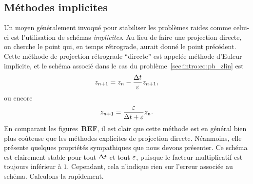 \subsection*{Méthodes implicites}

Un moyen généralement invoqué pour stabiliser les problèmes raides comme
celui-ci est l'utilisation de schémas \textit{implicites}. Au lieu de
faire une projection directe, on cherche le point qui, en temps
rétrograde, aurait donné le point précédent.
%
%
\noindent%
Cette méthode de projection rétrograde \enquote{directe} est appelée
méthode d'Euleur implicite, et le schéma associé dans le cas du
problème~\eqref{sec:intro:eq:pb_zlin} est 
\begin{equation*}
    z_{n+1} = z_n - \frac{\Delta t}{\varepsilon} z_{n+1} ,
\end{equation*}
ou encore 
\begin{equation*}
    z_{n+1} = \frac{\varepsilon}{\Delta t + \varepsilon} z_n .
\end{equation*}
En comparant les figures~\textbf{REF}, il est clair que
cette méthode est en général bien plus coûteuse que les méthodes
explicites de projection directe. Néanmoins, elle présente quelques
propriétés sympathiques que nous devons présenter. Ce schéma est
clairement stable pour tout $\Delta t$ et tout $\varepsilon$, puisque le facteur
multiplicatif est toujours inférieur à $1$. Cependant, cela n'indique
rien sur l'erreur associée au schéma. Calculons-la rapidement.

